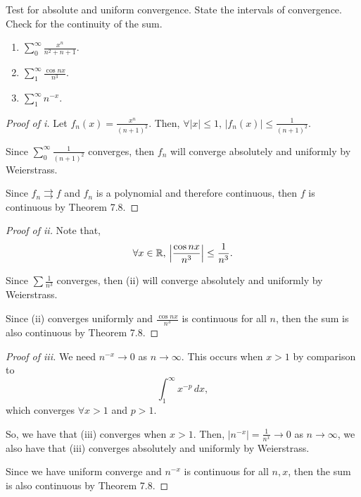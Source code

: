 \documentclass[../hw3]{subfiles}
\begin{document}
\begin{problem}
Test for absolute and uniform convergence.
State the intervals of convergence.
Check for the continuity of the sum.
\begin{enumerate}[label=\roman*)]
	\item $\sum_{0}^{\infty} \frac{x^n}{n^2 + n + 1}$.
	\item $\sum_{1}^{\infty} \frac{ \cos{nx}  }{n^3}$.
	\item $\sum_{1}^{\infty} n^{-x}$.
\end{enumerate}
\end{problem}
\begin{proof}[Proof of i]
	Let $f_n(x)=\frac{x^n}{{(n+1)}^2}$.
	Then, $\forall |x|\le 1,\, |f_n(x)|\le \frac{1}{{(n + 1)}^2}$.

	Since $\sum_{0}^{\infty} \frac{1}{{(n + 1)}^2}$ converges, then $f_n$ will converge absolutely and uniformly by Weierstrass.

	Since  $f_n \rightrightarrows f$ and $f_n$ is a polynomial and therefore continuous, then  $f$ is continuous by Theorem 7.8.
\end{proof}
\begin{proof}[Proof of ii]
	Note that, \[
		\forall x \in \mathbb{R},\, \left| \frac{\cos{nx} }{n^3} \right| \le \frac{1}{n^3}
		.\]

	Since $\sum \frac{1}{n^3} $ converges, then (ii) will converge absolutely and uniformly by Weierstrass.

	Since (ii) converges uniformly and  $\frac{\cos{nx} }{n^3}$ is continuous for all $n$, then the sum  is also continuous by Theorem 7.8.
\end{proof}
\begin{proof}[Proof of iii]
	We need $n^{-x}\to 0$ as $n\to \infty$.
	This occurs when $x>1$ by comparison to  \[
		\int_{1}^{\infty} x^{-p} \,dx
		,\] which converges $\forall x > 1$ and $p > 1$.

	So, we have that (iii) converges when $x>1$.
	Then, $\left|n^{-x}\right| = \frac{1}{n^{x}} \to  0$ as $n\to \infty$, we also have that (iii) converges absolutely and uniformly by Weierstrass.

	Since we have uniform converge and  $n^{-x}$ is continuous for all $n,x$, then the sum is also continuous by Theorem 7.8.
\end{proof}
\end{document}
